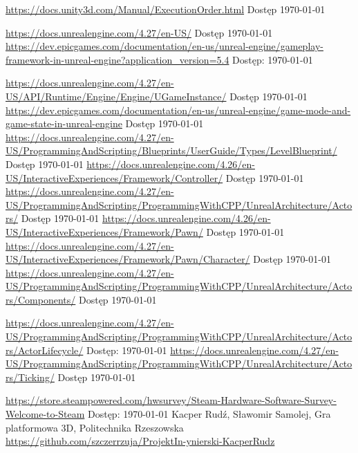 \documentclass[12pt,twoside]{article}
\begin{document}
\begin{thebibliography}{4}
 \url{https://docs.unity3d.com/Manual/ExecutionOrder.html} Dostęp \today

 \url{https://docs.unrealengine.com/4.27/en-US/} Dostęp \today
{} \url{https://dev.epicgames.com/documentation/en-us/unreal-engine/gameplay-framework-in-unreal-engine?application_version=5.4} Dostęp: \today

 \url{https://docs.unrealengine.com/4.27/en-US/API/Runtime/Engine/Engine/UGameInstance/} Dostęp \today
{}  \url{https://dev.epicgames.com/documentation/en-us/unreal-engine/game-mode-and-game-state-in-unreal-engine} Dostęp \today
{}  \url{https://docs.unrealengine.com/4.27/en-US/ProgrammingAndScripting/Blueprints/UserGuide/Types/LevelBlueprint/} Dostęp \today
{}  \url{https://docs.unrealengine.com/4.26/en-US/InteractiveExperiences/Framework/Controller/} Dostęp \today
{}  \url{https://docs.unrealengine.com/4.27/en-US/ProgrammingAndScripting/ProgrammingWithCPP/UnrealArchitecture/Actors/} Dostęp \today
{}  \url{https://docs.unrealengine.com/4.26/en-US/InteractiveExperiences/Framework/Pawn/} Dostęp \today
{}  \url{https://docs.unrealengine.com/4.27/en-US/InteractiveExperiences/Framework/Pawn/Character/} Dostęp \today
{}  \url{https://docs.unrealengine.com/4.27/en-US/ProgrammingAndScripting/ProgrammingWithCPP/UnrealArchitecture/Actors/Components/} Dostęp \today

 \url{https://docs.unrealengine.com/4.27/en-US/ProgrammingAndScripting/ProgrammingWithCPP/UnrealArchitecture/Actors/ActorLifecycle/} Dostęp: \today
{} \url{https://docs.unrealengine.com/4.27/en-US/ProgrammingAndScripting/ProgrammingWithCPP/UnrealArchitecture/Actors/Ticking/} Dostęp \today


 \url{https://store.steampowered.com/hwsurvey/Steam-Hardware-Software-Survey-Welcome-to-Steam} Dostęp: \today
{} Kacper Rudź, Sławomir Samolej, Gra platformowa 3D, Politechnika Rzeszowska \url{https://github.com/szczerrzuja/ProjektIn-ynierski-KacperRudz}

\end{thebibliography}

\clearpage

\makesummary
\end{document}
